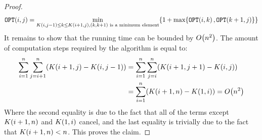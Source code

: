 \begin{proof}
$$\OPT\br{i,j} = \min_{K\br{i,j-1}\leq k\leq K\br{i +1,j}, (k,k+1) \text{ is a minimum element}}\brc{1+\max\brc{\OPT\br{i, k}, \OPT\br{k+1, j}}}
$$
It remains to show that the running time can be bounded by $O\br{n^2}$. The amount of computation steps required by the algorithm is equal to:
\begin{align*}
\sum_{i=1}^n\sum_{j=i+1}^n\br{K\br{i + 1, j} - K\br{i,j - 1}} &= \sum_{i=1}^n\sum_{j=i}^n\br{K\br{i + 1,j+1} - K\br{i,j}}
\\
&=\sum_{i=1}^n\br{K\br{i + 1,n}-K\br{1,i}} = O\br{n^2}
\end{align*}
Where the second equality is due to the fact that all of the terms except $K\br{i + 1,n}$ and $K\br{1,i}$ cancel, and the last equality is trivially due to the fact that $K\br{i + 1,n} < n$. This proves the claim.




\end{proof}
